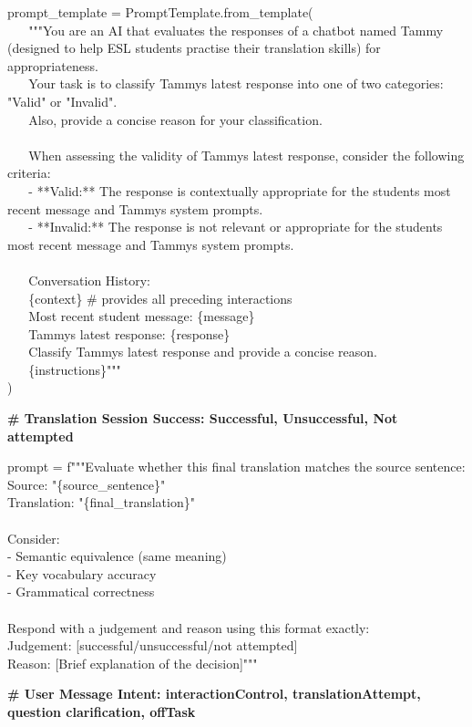 prompt\_template = PromptTemplate.from\_template(\\
 ~ ~ """You are an AI that evaluates the responses of a chatbot
named Tammy (designed to help ESL students practise their translation
skills) for appropriateness.\\
 ~ ~ Your task is to classify Tammy\textquotesingle s latest
response into one of two categories: "Valid" or "Invalid".\\
 ~ ~ Also, provide a concise reason for your classification.\\
 \\
 ~ ~ When assessing the validity of Tammy\textquotesingle s latest
response, consider the following criteria:\\
 ~ ~ - **Valid:** The response is contextually appropriate for the
student\textquotesingle s most recent message and
Tammy\textquotesingle s system prompts.\\
 ~ ~ - **Invalid:** The response is not relevant or appropriate
for the student\textquotesingle s most recent message and
Tammy\textquotesingle s system prompts.\\
 \\
 ~ ~ Conversation History:\\
 ~ ~ \{context\} \# provides all preceding interactions\\
 ~ ~ Most recent student message: \{message\}\\
 ~ ~ Tammy\textquotesingle s latest response: \{response\}\\
 ~ ~ Classify Tammy\textquotesingle s latest response and provide
a concise reason.\\
 ~ ~ \{instructions\}"""\\
)
\par\bigskip
\textbf{\# Translation Session Success: Successful, Unsuccessful, Not
attempted}

prompt = f"""Evaluate whether this final translation matches the source
sentence:\\
Source: "\{source\_sentence\}"\\
Translation: "\{final\_translation\}"\\
 \\
Consider:\\
- Semantic equivalence (same meaning)\\
- Key vocabulary accuracy\\
- Grammatical correctness\\
 \\
Respond with a judgement and reason using this format exactly:\\
Judgement: {[}successful/unsuccessful/not attempted{]}\\
Reason: {[}Brief explanation of the decision{]}"""
\par\bigskip
\textbf{\# User Message Intent: interactionControl, translationAttempt,
question clarification, offTask}


